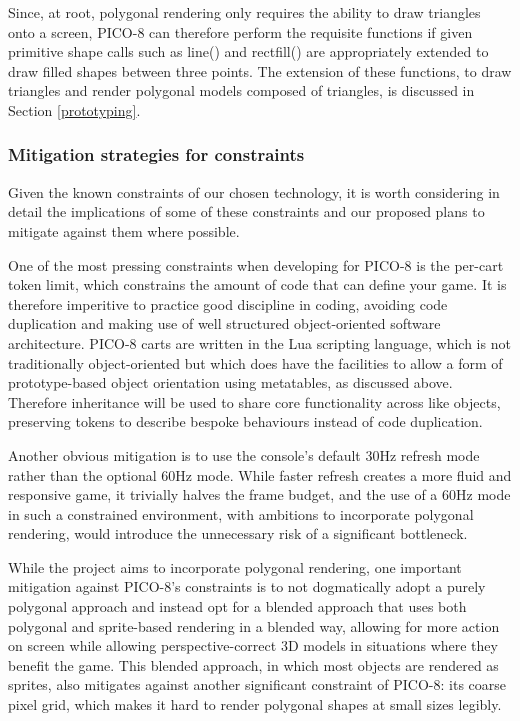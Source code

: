 \documentclass[11pt]{article}
\begin{document}
Since, at root, polygonal rendering only requires the ability to draw triangles onto a
screen, PICO-8 can therefore perform the requisite functions if given primitive shape calls such
as line() and rectfill() are appropriately extended to draw filled shapes between three points.
The extension of these functions, to draw triangles and render polygonal models composed of
triangles, is discussed in Section \ref{prototyping}.

\subsubsection*{Mitigation strategies for constraints}
Given the known constraints of our chosen technology, it is worth considering in detail
the implications of some of these constraints and our proposed plans to mitigate against them
where possible.


One of the most pressing constraints when developing for PICO-8 is the per-cart token
limit, which constrains the amount of code that can define your game. It is therefore
imperitive to practice good discipline in coding, avoiding code duplication and making use
of well structured object-oriented software architecture. PICO-8 carts are written in the
Lua scripting language, which is not traditionally object-oriented but which does have the
facilities to allow a form of prototype-based object orientation using metatables, as
discussed above. Therefore inheritance will be used to share core functionality across
like objects, preserving tokens to describe bespoke behaviours instead of code
duplication.


Another obvious mitigation is to use the console's default 30Hz refresh mode rather than
the optional 60Hz mode. While faster refresh creates a more fluid and responsive game,
it trivially halves the frame budget, and the use of a 60Hz mode in such a constrained
environment, with ambitions to incorporate polygonal rendering, would introduce the
unnecessary risk of a significant bottleneck.


While the project aims to incorporate polygonal rendering, one important mitigation against
PICO-8's constraints is to not dogmatically adopt a purely polygonal approach and instead
opt for a blended approach that uses both polygonal and sprite-based rendering in a
blended way, allowing for more action on screen while allowing perspective-correct 3D models
in situations where they benefit the game. This blended approach, in which most objects are
rendered as sprites, also mitigates against another significant constraint of PICO-8: its
coarse pixel grid, which makes it hard to render polygonal shapes at small sizes legibly.
\end{document}
